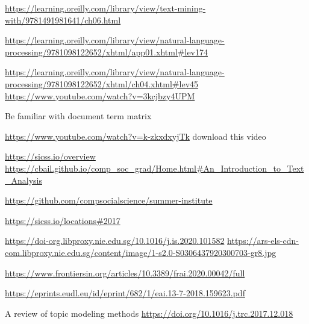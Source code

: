 \documentclass[
]{book}
\begin{document}
\url{https://learning.oreilly.com/library/view/text-mining-with/9781491981641/ch06.html}

\url{https://learning.oreilly.com/library/view/natural-language-processing/9781098122652/xhtml/app01.xhtml\#lev174}

\url{https://learning.oreilly.com/library/view/natural-language-processing/9781098122652/xhtml/ch04.xhtml\#lev45}
\url{https://www.youtube.com/watch?v=3kcjbzy4UPM}

Be familiar with document term matrix

\url{https://www.youtube.com/watch?v=k-zkxdxyjTk} download this video

\url{https://sicss.io/overview}
\url{https://cbail.github.io/comp_soc_grad/Home.html\#An_Introduction_to_Text_Analysis}

\url{https://github.com/compsocialscience/summer-institute}

\url{https://sicss.io/locations\#2017}

\url{https://doi-org.libproxy.nie.edu.sg/10.1016/j.is.2020.101582}
\url{https://ars-els-cdn-com.libproxy.nie.edu.sg/content/image/1-s2.0-S0306437920300703-gr8.jpg}

\url{https://www.frontiersin.org/articles/10.3389/frai.2020.00042/full}

\url{https://eprints.eudl.eu/id/eprint/682/1/eai.13-7-2018.159623.pdf}

A review of topic modeling methods
\url{https://doi.org/10.1016/j.trc.2017.12.018}

  
\end{document}
